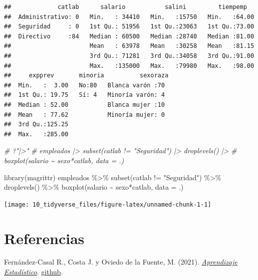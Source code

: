 \documentclass[
]{book}
\newenvironment{Shaded}{\begin{snugshade}}{\end{snugshade}}
\newcommand{\AttributeTok}[1]{\textcolor[rgb]{0.77,0.63,0.00}{#1}}
\newcommand{\CommentTok}[1]{\textcolor[rgb]{0.56,0.35,0.01}{\textit{#1}}}
\newcommand{\FunctionTok}[1]{\textcolor[rgb]{0.00,0.00,0.00}{#1}}
\newcommand{\NormalTok}[1]{#1}
\newcommand{\SpecialCharTok}[1]{\textcolor[rgb]{0.00,0.00,0.00}{#1}}
\newcommand{\StringTok}[1]{\textcolor[rgb]{0.31,0.60,0.02}{#1}}
\theoremstyle{break}
\theoremstyle{nonumberplain}
\begin{document}
\begin{verbatim}
##             catlab      salario           salini         tiempemp    
##  Administrativo: 0   Min.   : 34410   Min.   :15750   Min.   :64.00  
##  Seguridad     : 0   1st Qu.: 51956   1st Qu.:23063   1st Qu.:73.00  
##  Directivo     :84   Median : 60500   Median :28740   Median :81.00  
##                      Mean   : 63978   Mean   :30258   Mean   :81.15  
##                      3rd Qu.: 71281   3rd Qu.:34058   3rd Qu.:91.00  
##                      Max.   :135000   Max.   :79980   Max.   :98.00  
##     expprev       minoria          sexoraza 
##  Min.   :  3.00   No:80   Blanca varón :70  
##  1st Qu.: 19.75   Sí: 4   Minoría varón: 4  
##  Median : 52.00           Blanca mujer :10  
##  Mean   : 77.62           Minoría mujer: 0  
##  3rd Qu.:125.25                             
##  Max.   :285.00
\end{verbatim}

\begin{Shaded}
\begin{Highlighting}[]
\CommentTok{\# ?"|\textgreater{}"}
\CommentTok{\# empleados |\textgreater{} subset(catlab != "Seguridad") |\textgreater{} droplevels() |\textgreater{} }
\CommentTok{\#     boxplot(salario \textasciitilde{} sexo*catlab, data = .)}

\FunctionTok{library}\NormalTok{(magrittr)}
\NormalTok{empleados }\SpecialCharTok{\%\textgreater{}\%} \FunctionTok{subset}\NormalTok{(catlab }\SpecialCharTok{!=} \StringTok{"Seguridad"}\NormalTok{) }\SpecialCharTok{\%\textgreater{}\%} \FunctionTok{droplevels}\NormalTok{() }\SpecialCharTok{\%\textgreater{}\%}
    \FunctionTok{boxplot}\NormalTok{(salario }\SpecialCharTok{\textasciitilde{}}\NormalTok{ sexo}\SpecialCharTok{*}\NormalTok{catlab, }\AttributeTok{data =}\NormalTok{ .)}
\end{Highlighting}
\end{Shaded}

\begin{center}\texttt{[image: 10\_tidyverse\_files/figure-latex/unnamed-chunk-1-1]} \end{center}

\hypertarget{referencias}{%
\chapter*{Referencias}\label{referencias}}

Fernández-Casal R., Costa J. y Oviedo de la Fuente, M. (2021). \emph{\href{https://rubenfcasal.github.io/aprendizaje_estadistico}{Aprendizaje Estadístico}}. \href{https://github.com/rubenfcasal/aprendizaje_estadistico}{github}.
\end{document}

